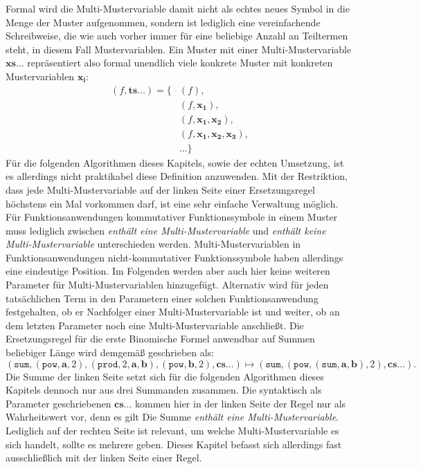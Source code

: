 Formal wird die Multi-Mustervariable damit nicht als echtes neues Symbol in die Menge der Muster aufgenommen, sondern ist lediglich eine vereinfachende Schreibweise, die wie auch vorher immer für eine beliebige Anzahl an Teiltermen steht, in diesem Fall Mustervariablen. Ein Muster mit einer Multi-Mustervariable $\mathbf{xs...}$ repräsentiert also formal unendlich viele konkrete Muster mit konkreten Mustervariablen $\mathbf{x_i}$:
\begin{equation*}
	\begin{split}
			(f, \mathbf{ts...}) = \{&(f), \\
			&(f, \mathbf{x_1}),\\
			&(f, \mathbf{x_1}, \mathbf{x_2}), \\
			&(f, \mathbf{x_1}, \mathbf{x_2}, \mathbf{x_3}), \\
			&\dots \}    		
	\end{split}
\end{equation*}
Für die folgenden Algorithmen dieses Kapitels, sowie der echten Umsetzung, ist es allerdings nicht praktikabel diese Definition anzuwenden. Mit der Restriktion, dass jede Multi-Mustervariable auf der linken Seite einer Ersetzungsregel höchstens ein Mal vorkommen darf, ist eine sehr einfache Verwaltung möglich. Für Funktionsanwendungen kommutativer Funktionssymbole in einem Muster muss lediglich zwischen \emph{enthält eine Multi-Mustervariable} und \emph{enthält keine Multi-Mustervariable} unterschieden werden. Multi-Mustervariablen in Funktionsanwendungen nicht-kommutativer Funktionssymbole haben allerdings eine eindeutige Position. Im Folgenden werden aber auch hier keine weiteren Parameter für Multi-Mustervariablen hinzugefügt. Alternativ wird für jeden tatsächlichen Term in den Parametern einer solchen Funktionsanwendung festgehalten, ob er Nachfolger einer Multi-Mustervariable ist und weiter, ob an dem letzten Parameter noch eine Multi-Mustervariable anschließt. 
Die Ersetzungsregel für die erste Binomische Formel anwendbar auf Summen beliebiger Länge wird demgemäß  geschrieben als:
$$(\texttt{sum}, (\texttt{pow}, \mathbf a, 2), (\texttt{prod}, 2, \mathbf a, \mathbf b), (\texttt{pow}, \mathbf b, 2), \mathbf{cs...}) \mapsto (\texttt{sum}, (\texttt{pow}, (\texttt{sum}, \mathbf a, \mathbf b), 2), \mathbf{cs...}).$$
Die Summe der linken Seite setzt sich für die folgenden Algorithmen dieses Kapitels dennoch nur aus drei Summanden zusammen. Die syntaktisch als Parameter geschriebenen $\mathbf{cs...}$ kommen hier in der linken Seite der Regel nur als Wahrheitswert vor, denn es gilt \glqq Die Summe \emph{enthält eine Multi-Mustervariable}\grqq{}. Lediglich auf der rechten Seite ist relevant, um welche Multi-Mustervariable es sich handelt, sollte es mehrere geben. Dieses Kapitel befasst sich allerdings fast ausschließlich mit der linken Seite einer Regel.



